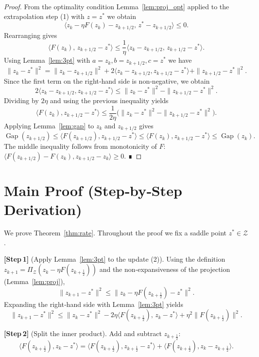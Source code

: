 \documentclass{article}
\newcommand{\gap}{\operatorname{Gap}}
\begin{document}
\begin{proof}
From the optimality condition Lemma~\ref{lem:proj_opt} applied to the extrapolation step (1) with $z=z^{*}$ we obtain
\[
\langle z_{k}-\eta F(z_{k})-z_{k+1/2},\,z^{*}-z_{k+1/2}\rangle\le0 .
\]
Rearranging gives
\[
\langle F(z_{k}),\,z_{k+1/2}-z^{*}\rangle
\le\frac{1}{\eta}\langle z_{k}-z_{k+1/2},\,z_{k+1/2}-z^{*}\rangle .
\]
Using Lemma~\ref{lem:3pt} with $a=z_{k},b=z_{k+1/2},c=z^{*}$ we have
\[
\|z_{k}-z^{*}\|^{2}
=\|z_{k}-z_{k+1/2}\|^{2}+2\langle z_{k}-z_{k+1/2},z_{k+1/2}-z^{*}\rangle
+\|z_{k+1/2}-z^{*}\|^{2}.
\]
Since the first term on the right‑hand side is non‑negative, we obtain
\[
2\langle z_{k}-z_{k+1/2},z_{k+1/2}-z^{*}\rangle
\le\|z_{k}-z^{*}\|^{2}-\|z_{k+1/2}-z^{*}\|^{2}.
\]
Dividing by $2\eta$ and using the previous inequality yields
\[
\langle F(z_{k}),z_{k+1/2}-z^{*}\rangle
\le\frac{1}{2\eta}\bigl(\|z_{k}-z^{*}\|^{2}-\|z_{k+1/2}-z^{*}\|^{2}\bigr).
\]
Applying Lemma~\ref{lem:gap} to $z_{k}$ and $z_{k+1/2}$ gives
\[
\gap(z_{k+1/2})\le\langle F(z_{k+1/2}),z_{k+1/2}-z^{*}\rangle
\le\langle F(z_{k}),z_{k+1/2}-z^{*}\rangle
\le\gap(z_{k}) .
\]
The middle inequality follows from monotonicity of $F$:
$\langle F(z_{k+1/2})-F(z_{k}),z_{k+1/2}-z_{k}\rangle\ge0$.
∎
\end{proof}

\section*{Main Proof (Step‑by‑Step Derivation)}
We prove Theorem~\ref{thm:rate}.  Throughout the proof we fix a saddle point $z^{*}\in\mathcal Z$.

\bigskip
\noindent\textbf{[Step 1]} (Apply Lemma~\ref{lem:3pt} to the update (2)).  
Using the definition $z_{k+1}= \Pi_{\mathcal Z}(z_{k}-\eta F(z_{k+\frac12}))$ and the non‑expansiveness of the projection (Lemma~\ref{lem:proj}),
\[
\|z_{k+1}-z^{*}\|^{2}
\le\|z_{k}-\eta F(z_{k+\frac12})-z^{*}\|^{2}.
\]
Expanding the right‑hand side with Lemma~\ref{lem:3pt} yields
\begin{equation}
\|z_{k+1}-z^{*}\|^{2}
\le\|z_{k}-z^{*}\|^{2}
-2\eta\langle F(z_{k+\frac12}),\,z_{k}-z^{*}\rangle
+\eta^{2}\|F(z_{k+\frac12})\|^{2}.
\tag{3}
\end{equation}

\bigskip
\noindent\textbf{[Step 2]} (Split the inner product).  
Add and subtract $z_{k+\frac12}$:
\[
\langle F(z_{k+\frac12}),z_{k}-z^{*}\rangle
= \langle F(z_{k+\frac12}),z_{k+\frac12}-z^{*}\rangle
+ \langle F(z_{k+\frac12}),z_{k}-z_{k+\frac12}\rangle .
\tag{4}
\]
\end{document}
